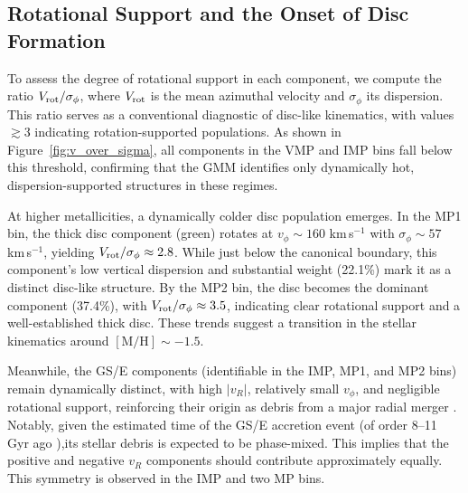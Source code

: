 \documentclass[a4paper,12pt]{article}
\begin{document}
\subsection{Rotational Support and the Onset of Disc Formation}

To assess the degree of rotational support in each component, we compute the ratio 
$V_{\rm rot} / \sigma_\phi$, where $V_{\rm rot}$ is the mean azimuthal velocity and 
$\sigma_\phi$ its dispersion. This ratio serves as a conventional diagnostic of disc-like 
kinematics, with values $\gtrsim 3$ indicating rotation-supported populations. As shown in 
Figure~\ref{fig:v_over_sigma}, all components in the VMP and IMP bins fall below this threshold, 
confirming that the GMM identifies only dynamically hot, dispersion-supported structures in these 
regimes.

At higher metallicities, a dynamically colder disc population emerges. In the MP1 bin, the thick 
disc component (green) rotates at $v_\phi \sim 160$ km\,s$^{-1}$ with $\sigma_\phi \sim 57$ km\,s$^{-1}$, 
yielding $V_{\rm rot} / \sigma_\phi \approx 2.8$. While just below the canonical boundary, this 
component’s low vertical dispersion and substantial weight (22.1\%) mark it as a distinct disc-like 
structure. By the MP2 bin, the disc becomes the dominant component (37.4\%), with 
$V_{\rm rot} / \sigma_\phi \approx 3.5$, indicating clear rotational support and a well-established 
thick disc. These trends suggest a transition in the stellar kinematics around 
$\mathrm{[M/H]} \sim -1.5$.

Meanwhile, the GS/E components (identifiable in the IMP, MP1, and MP2 bins) remain dynamically 
distinct, with high $|v_R|$, relatively small $v_\phi$, and negligible rotational support, reinforcing 
their origin as debris from a major radial merger \citep{Helmi2018}. Notably, given 
the estimated time of the GS/E accretion event (of order 8–11 Gyr ago \citep{Gallart2019,Belokurov2020,DiMatteo2019}),its stellar 
debris is expected to be phase-mixed. This 
implies that the positive and negative $v_R$ components should contribute approximately equally. 
This symmetry is observed in the IMP and two MP bins. 
\end{document}
